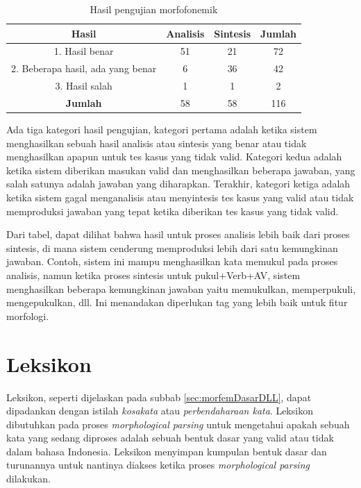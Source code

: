\begin{table}[H]
\centering
\begin{tabular}{|c|c|c|c|}
\hline
\textbf{Hasil} & \textbf{Analisis} & \textbf{Sintesis} & \textbf{Jumlah} \\
\hline
1. Hasil benar & 51 & 21 & 72 \\
\hline
2. Beberapa hasil, ada yang benar & 6 & 36 & 42 \\
\hline
3. Hasil salah & 1 & 1 & 2 \\
\hline
\textbf{Jumlah} & 58 & 58 & 116 \\
\hline
\end{tabular}
\caption{Hasil pengujian morfofonemik\cite{manurung:08:indonesian}}
\label{tabel-hasil-pengujian-morfofonemik}
\end{table}

Ada tiga kategori hasil pengujian, kategori pertama adalah ketika sistem menghasilkan sebuah hasil analisis atau sintesis yang benar atau tidak menghasilkan apapun untuk tes kasus yang tidak valid. Kategori kedua adalah ketika sistem diberikan masukan valid dan menghasilkan beberapa jawaban, yang salah satunya adalah jawaban yang diharapkan. Terakhir, kategori ketiga adalah ketika sistem gagal menganalisis atau menyintesis tes kasus yang valid atau tidak memproduksi jawaban yang tepat ketika diberikan tes kasus yang tidak valid.

Dari tabel, dapat dilihat bahwa hasil untuk proses analisis lebih baik dari proses sintesis, di mana sistem cenderung memproduksi lebih dari satu kemungkinan jawaban. Contoh, sistem ini mampu menghasilkan kata memukul pada proses analisis, namun ketika proses sintesis untuk pukul+Verb+AV, sistem menghasilkan beberapa kemungkinan jawaban yaitu memukulkan, memperpukuli, mengepukulkan, dll. Ini menandakan diperlukan tag yang lebih baik untuk fitur morfologi.

\section{Leksikon}
\label{sec:leksikon}
Leksikon, seperti dijelaskan pada subbab \ref{sec:morfemDasarDLL}, dapat dipadankan dengan istilah \textit{kosakata} atau \textit{perbendaharaan kata}. Leksikon dibutuhkan pada proses \textit{morphological parsing} untuk mengetahui apakah sebuah kata yang sedang diproses adalah sebuah bentuk dasar yang valid atau tidak dalam bahasa Indonesia. Leksikon menyimpan kumpulan bentuk dasar dan turunannya untuk nantinya diakses ketika proses \textit{morphological parsing} dilakukan.

